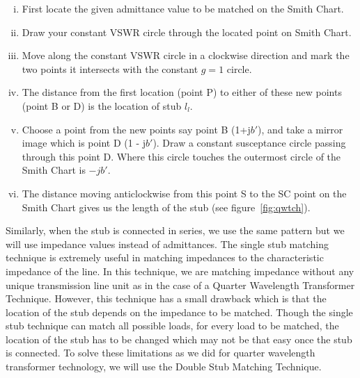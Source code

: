 \begin{enumerate}[(i)]
\item First locate the given admittance value to be matched on the Smith Chart.
\item Draw your constant VSWR circle through the located point on Smith Chart.
\item Move along the constant VSWR circle in a clockwise direction and mark the two points it intersects with the constant $g = 1$ circle.
\item The distance from the first location (point P) to either of these new points (point B or D) is the location of stub $l_l$.
\item Choose a point from the new points say point B (1+j$b'$), and take a mirror image which is point D (1 - j$b'$). Draw a constant susceptance circle passing through this point D. Where this circle touches the outermost circle of the Smith Chart is $-jb'$.
\item The distance moving anticlockwise from this point S to the SC point on the Smith Chart gives us the length of the stub (see figure~\ref{fig:qwtch}).
\end{enumerate}

Similarly, when the stub is connected in series, we use the same pattern but we will use impedance values instead of admittances. The single stub matching technique is extremely useful in matching impedances to the characteristic impedance of the line. In this technique, we are matching impedance without any unique transmission line unit as in the case of a Quarter Wavelength Transformer Technique. However, this technique has a small drawback which is that the location of the stub depends on the impedance to be matched. Though the single stub technique can match all possible loads, for every load to be matched, the location of the stub has to be changed which may not be that easy once the stub is connected. To solve these limitations as we did for quarter wavelength transformer technology, we will use the Double Stub Matching Technique.

